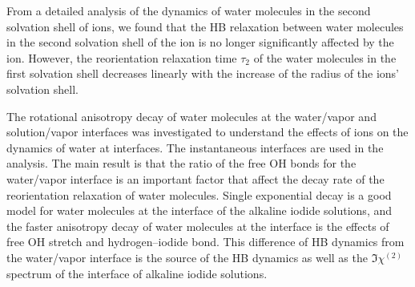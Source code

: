 
From a detailed analysis of the dynamics of water molecules in the second solvation shell of ions, 
we found that the HB relaxation between water molecules in the second solvation shell of the ion is 
no longer significantly affected by the ion.
However, the reorientation relaxation time $\tau_2$ of the water molecules in the first solvation shell 
decreases linearly with the increase of the radius of the ions' solvation shell. 

The rotational anisotropy decay of water molecules at the water/vapor and solution/vapor interfaces was investigated to
understand the effects of ions on the dynamics of water at interfaces.
The instantaneous interfaces are used in the analysis. The main result is that the ratio of the free OH bonds for the water/vapor interface is an important factor 
that affect the decay rate of the reorientation relaxation of water molecules.
Single exponential decay is a good model for water molecules at the interface of the alkaline iodide solutions,
and the faster anisotropy decay of water molecules at the interface is the effects of free OH stretch and hydrogen--iodide bond.
This difference of HB dynamics from the water/vapor interface is the source of 
the HB dynamics as well as the $\Im\chi^{(2)}$ spectrum of the interface of alkaline iodide solutions.  
